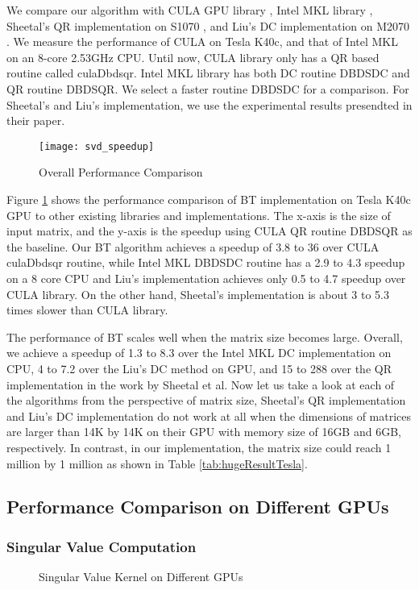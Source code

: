 We compare our algorithm with CULA GPU library \cite{cula}, Intel MKL library \cite{mkl}, Sheetal's QR implementation on S1070 \cite{09IPDPSQR}, and Liu's DC implementation on M2070 \cite{13CFDC}.
We measure the performance of CULA on Tesla K40c, and that of Intel MKL on an 8-core 2.53GHz CPU.
Until now, CULA library only has a QR based routine called culaDbdsqr.
Intel MKL library has both DC routine DBDSDC and QR routine DBDSQR. We select a faster routine DBDSDC for a comparison.
For Sheetal's \cite{09IPDPSQR} and Liu's \cite{13CFDC} implementation, we use the experimental results presendted in their paper. 

\begin{figure}[hbpt]
\centering
\texttt{[image: svd\_speedup]}
\caption{Overall Performance Comparison}
\label{fig:svd_speedup}
\vspace{-0.1in}
\end{figure}
Figure \ref{fig:svd_speedup} shows the performance comparison of BT
implementation on Tesla K40c GPU to other existing libraries
and implementations.
The x-axis is the size of input matrix, and the y-axis is the speedup
using CULA QR routine DBDSQR as the baseline.
Our BT algorithm achieves a speedup of 3.8 to 36 over CULA culaDbdsqr routine,
while Intel MKL DBDSDC routine has a 2.9 to 4.3 speedup on a 8 core CPU and Liu's implementation achieves only 0.5 to 4.7 speedup over CULA library.
On the other hand, Sheetal's implementation is about 3 to 5.3 times slower than CULA library.

The performance of BT scales well when the matrix size becomes large.
Overall, we achieve a speedup of 1.3 to 8.3 over the Intel MKL
DC implementation on CPU, 4 to 7.2 over the Liu's
DC method on GPU, and 15 to 288 over the QR implementation in the work by Sheetal et al.
Now let us take a look at each of the algorithms from the perspective of matrix size, Sheetal's QR implementation and Liu's DC implementation do not work at all when the dimensions of matrices are larger than 14K by 14K on their GPU with memory size of 16GB and 6GB, respectively. In contrast, in our implementation, the matrix size could reach 1 million by 1 million as shown in Table \ref{tab:hugeResultTesla}.

\subsection{Performance Comparison on Different GPUs}

\subsubsection{Singular Value Computation}
\begin{figure}[hbpt]
\centering
  \caption{Singular Value Kernel on Different GPUs}
  \label{fig:svdval}
\vspace{-0.2in}
\end{figure}

